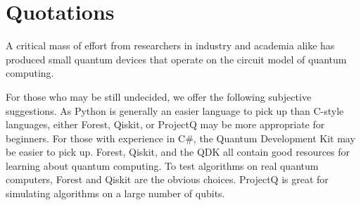 \documentclass{article}
\begin{document}
\section{Quotations}
A critical mass of effort from researchers in industry and academia alike has produced small quantum devices that operate on the circuit model of quantum computing.

For those who may be still undecided, we offer the following subjective suggestions. As Python is generally an easier language to pick up than C-style languages, either Forest, Qiskit, or ProjectQ may be more appropriate for beginners. For those with experience in C\#, the Quantum Development Kit may be easier to pick up. Forest, Qiskit, and the QDK all contain good resources for learning about quantum computing. To test algorithms on real quantum computers, Forest and Qiskit are the obvious choices. ProjectQ is great for simulating algorithms on a large number of qubits.
\end{document}
